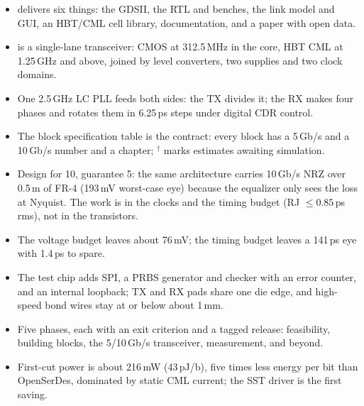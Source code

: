 \begin{takeaways}
\begin{itemize}
  \item \OS{} delivers six things: the GDSII, the RTL and benches, the link model and GUI, an HBT/CML cell library, documentation, and a paper with open data.
  \item \OS{} is a single-lane transceiver: CMOS at 312.5\,MHz in the core, HBT CML at 1.25\,GHz and above, joined by level converters, two supplies and two clock domains.
  \item One 2.5\,GHz LC PLL feeds both sides: the TX divides it; the RX makes four phases and rotates them in 6.25\,ps steps under digital CDR control.
  \item The block specification table is the contract: every block has a 5\,Gb/s and a 10\,Gb/s number and a chapter; $^\dagger$ marks estimates awaiting simulation.
  \item Design for 10, guarantee 5: the same architecture carries 10\,Gb/s NRZ over 0.5\,m of FR-4 (193\,mV worst-case eye) because the equalizer only sees the loss at Nyquist. The work is in the clocks and the timing budget (RJ $\le0.85$\,ps rms), not in the transistors.
  \item The voltage budget leaves about 76\,mV; the timing budget leaves a 141\,ps eye with 1.4\,ps to spare.
  \item The test chip adds SPI, a PRBS generator and checker with an error counter, and an internal loopback; TX and RX pads share one die edge, and high-speed bond wires stay at or below about 1\,mm.
  \item Five phases, each with an exit criterion and a tagged release: feasibility, building blocks, the 5/10\,Gb/s transceiver, measurement, and beyond.
  \item First-cut power is about 216\,mW (43\,pJ/b), five times less energy per bit than OpenSerDes, dominated by static CML current; the SST driver is the first saving.
\end{itemize}
\end{takeaways}
